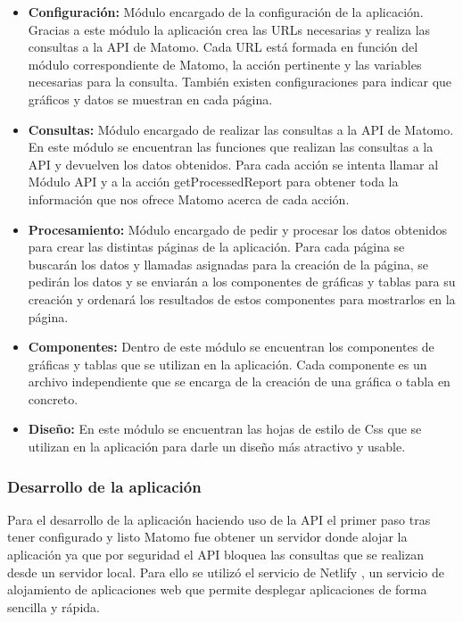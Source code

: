 \begin{itemize}
    \item \textbf{Configuración:} Módulo encargado de la configuración de la aplicación. Gracias a este módulo la aplicación
    crea las URLs necesarias y realiza las consultas a la API de Matomo. Cada URL está formada en función del módulo 
    correspondiente de Matomo, la acción pertinente y las variables necesarias para la consulta. También existen configuraciones
    para indicar que gráficos y datos se muestran en cada página. 
    \item \textbf{Consultas:} Módulo encargado de realizar las consultas a la API de Matomo. En este módulo se encuentran las
    funciones que realizan las consultas a la API y devuelven los datos obtenidos. Para cada acción se intenta llamar al Módulo
    API y a la acción getProcessedReport para obtener toda la información que nos ofrece Matomo acerca de cada acción. 
    \item \textbf{Procesamiento:} Módulo encargado de pedir y procesar los datos obtenidos para crear las distintas páginas
    de la aplicación. Para cada página se buscarán los datos y llamadas asignadas para la creación de la página, se pedirán 
    los datos y se enviarán a los componentes de gráficas y tablas para su creación y ordenará los resultados de estos componentes 
    para mostrarlos en la página.
    \item \textbf{Componentes:} Dentro de este módulo se encuentran los componentes de gráficas y tablas que se utilizan en la
    aplicación. Cada componente es un archivo independiente que se encarga de la creación de una gráfica o tabla en concreto.
    \item \textbf{Diseño:} En este módulo se encuentran las hojas de estilo de Css que se utilizan en la aplicación para darle
    un diseño más atractivo y usable.
\end{itemize}

\subsubsection{Desarrollo de la aplicación}
\label{sec:desarrollo-aplicacion}

Para el desarrollo de la aplicación haciendo uso de la API el primer paso tras tener configurado y listo Matomo fue obtener un 
servidor donde alojar la aplicación ya que por seguridad el API bloquea las consultas que se realizan desde un servidor local.
Para ello se utilizó el servicio de Netlify \cite{netlify}, un servicio de alojamiento de aplicaciones web que permite desplegar aplicaciones
de forma sencilla y rápida.
   

